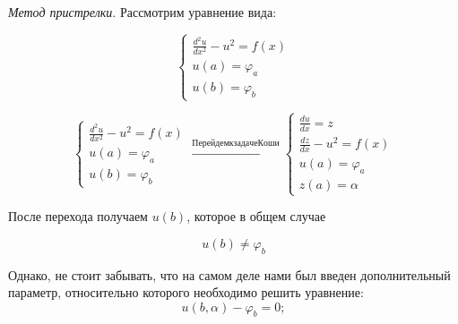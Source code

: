 \documentclass[10pt,a4paper]{article}
\begin{document}
	
	\textit{Метод пристрелки}. Рассмотрим уравнение вида:
	
	\begin{equation}
		\begin{cases}
			\frac{d^{2}u}{dx^{2}} - u^{2} = f\left(x\right)
			\\
			u\left(a\right) = \varphi_{a}
			\\
			u\left(b\right) = \varphi_{b}
		\end{cases}
	\end{equation}
	
	\begin{equation}
		\begin{cases}
			\frac{d^{2}u}{dx^{2}} - u^{2} = f\left(x\right)
			\\
			u\left(a\right) = \varphi_{a}
			\\
			u\left(b\right) = \varphi_{b}
		\end{cases} \xrightarrow{Перейдем к задаче Коши}
		\begin{cases}
			\frac{du}{dx} = z
			\\
			\frac{dz}{dx} - u^{2} = f\left(x\right)
			\\
			u\left(a\right) = \varphi_{a}
			\\
			z\left(a\right) = \alpha
		\end{cases}
	\end{equation}
	
	После перехода получаем $u\left(b\right)$, которое в общем случае 
	
	\begin{equation}
		u\left(b\right) \neq \varphi_{b}
	\end{equation}
	
	Однако, не стоит забывать, что на самом деле нами был введен дополнительный 
	параметр, относительно которого необходимо решить уравнение:
	\begin{equation}
		u\left(b, \alpha\right) - \varphi_{b} = 0;
	\end{equation}
	
\end{document}
